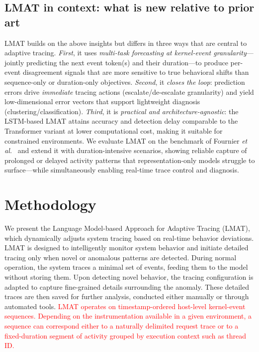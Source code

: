 \documentclass[preprint,12pt]{elsarticle}
\begin{document}
\subsection{LMAT in context: what is new relative to prior art}
LMAT builds on the above insights but differs in three ways that are central to adaptive tracing.
\emph{First}, it uses \emph{multi-task forecasting at kernel-event granularity}—jointly predicting the next event token(s) and their duration—to produce per-event disagreement signals that are more sensitive to true behavioral shifts than sequence-only or duration-only objectives.
\emph{Second}, it \emph{closes the loop}: prediction errors drive \emph{immediate} tracing actions (escalate/de-escalate granularity) and yield low-dimensional error vectors that support lightweight diagnosis (clustering/classification).
\emph{Third}, it is \emph{practical and architecture-agnostic}: the LSTM-based LMAT attains accuracy and detection delay comparable to the Transformer variant at lower computational cost, making it suitable for constrained environments.
We evaluate LMAT on the benchmark of Fournier \textit{et al.}~\cite{fournier2023language} and extend it with duration-intensive scenarios, showing reliable capture of prolonged or delayed activity patterns that representation-only models struggle to surface—while simultaneously enabling real-time trace control and diagnosis.




\section{Methodology}\label{methodology}
We present the Language Model-based Approach for Adaptive Tracing (LMAT), which dynamically adjusts system tracing based on real-time behavior deviations. LMAT is designed to intelligently monitor system behavior and initiate detailed tracing only when novel or anomalous patterns are detected. During normal operation, the system traces a minimal set of events, feeding them to the model without storing them. Upon detecting novel behavior, the tracing configuration is adapted to capture fine-grained details surrounding the anomaly. These detailed traces are then saved for further analysis, conducted either manually or through automated tools. \textcolor{red}{LMAT operates on timestamp-ordered host-level kernel-event sequences. Depending on the instrumentation available in a given environment, a sequence can correspond either to a naturally delimited request trace or to a fixed-duration segment of activity grouped by execution context such as thread ID.}
\end{document}
